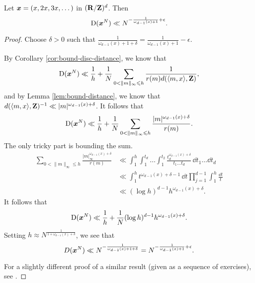 \begin{theorem}
Let ${\boldsymbol x}=(x,2x,3x,\dots)$ in $(\mathbf{R}/\mathbf{Z})^d$. Then 
\[
	\operatorname{D}({\boldsymbol x}^N) \ll N^{-\frac{1}{\omega_{d-1}(x)+1}+\epsilon} .
\]
\end{theorem}
\begin{proof}
Choose $\delta>0$ such that 
$\frac{1}{\omega_{d-1}(x)+1+\delta} = \frac{1}{\omega_{d-1}(x)+1} - \epsilon$. 

By Corollary \ref{cor:bound-disc-distance}, we know that 
\[
	\operatorname{D}({\boldsymbol x}^N) \ll \frac 1 h + \frac 1 N \sum_{0<\|m\|_\infty \leqslant h} \frac{1}{r(m) d(\langle m,x\rangle,\mathbf{Z})} ,
\]
and by Lemma \ref{lem:bound-distance}, we know that 
$d(\langle m,x\rangle,\mathbf{Z})^{-1} \ll |m|^{\omega_{d-1}(x)+\delta}$. 
It follows that 
\[
	\operatorname{D}({\boldsymbol x}^N) \ll \frac 1 h + \frac 1 N \sum_{0 < \|m\|_\infty \leqslant h} \frac{|m|^{\omega_{d-1}(x)+\delta}}{r(m)} .
\]
The only tricky part is bounding the sum. 
\begin{align*}
	\sum_{0< \|m\|_\infty \leqslant h} \frac{|m|_\infty^{\omega_{d-1}(x)+\delta}}{r(m)} 
		&\ll \int_1^h \int_1^{t_d} \dots \int_1^{t_2} \frac{t_d^{\omega_{d-1}(x)+\delta}}{t_1 \dots t_d}\, \dd t_1 \dots \dd t_d \\
		&\ll \int_1^h t^{\omega_{d-1}(x)+\delta-1}\, \dd t \prod_{j=1}^{d-1} \int_1^h \frac{\dd t}{t} \\
		&\ll (\log h)^{d-1} h^{\omega_{d-1}(x)+\delta} .
\end{align*}
It follows that 
\[
	\operatorname{D}({\boldsymbol x}^N) \ll \frac 1 h + \frac 1 N (\log h)^{d-1} h^{\omega_{d-1}(x)+\delta} .
\]
Setting $h\approx N^{\frac{1}{1+\omega_{d-1}(x)+\delta}}$, we see that 
\[
	D({\boldsymbol x}^N) \ll N^{-\frac{1}{\omega_{d-1}(x)+1+\delta}} = N^{-\frac{1}{\omega_{d-1}(x)+1} + \epsilon} .
\]

For a slightly different proof of a similar result (given as a sequence of 
exercises), see  \cite[Ch.~2, Ex.~3.15, 16, 17]{kuipers-niederreiter-1974}. 
\end{proof}

